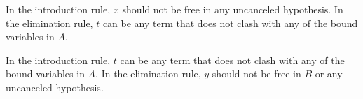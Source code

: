\documentclass[letterpaper,10pt,english]{sphinxmanual}
\begin{document}
\sphinxAtStartPar
{}



\begin{quote}
\AXM{}
\noLine
\UIM{\vdots}
\noLine
{}
\AXM{}
\noLine
\UIM{\vdots}
\noLine
{}
\DP
{}
\DP
\quad\quad
{}
\DP
\end{quote}

\sphinxAtStartPar
{}



\begin{quote}
\AXM{}
\noLine
\UIM{\vdots}
\noLine
\UIM{\bot}
\DP
\end{quote}

\sphinxAtStartPar
{}



\begin{quote}
\DP
\quad\quad
{}
\DP
\end{quote}

\sphinxAtStartPar
In the introduction rule, \(x\) should not be free in any uncanceled hypothesis. In the elimination rule, \(t\) can be any term that does not clash with any of the bound variables in \(A\).

\sphinxAtStartPar
{}



\begin{quote}
\DP
\quad\quad
{}
\AXM{}
\noLine
\UIM{\vdots}
\noLine
{}
\DP
\end{quote}

\sphinxAtStartPar
In the introduction rule, \(t\) can be any term that does not clash with any of the bound variables in \(A\). In the elimination rule, \(y\) should not be free in \(B\) or any uncanceled hypothesis.

\sphinxAtStartPar
{}
\end{document}
